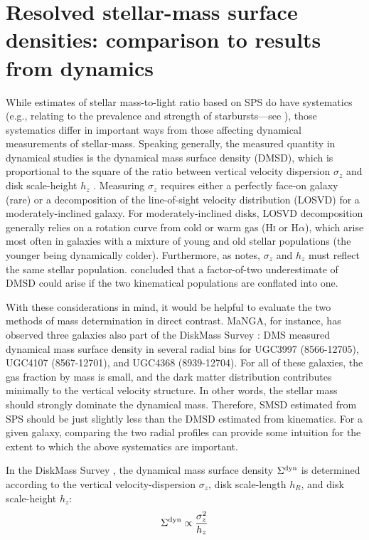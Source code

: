\section{Resolved stellar-mass surface densities: comparison to results from dynamics}
\label{chap2:sec:dms_compare}

While estimates of stellar mass-to-light ratio based on SPS do have systematics (e.g., relating to the prevalence and strength of starbursts---see ), those systematics differ in important ways from those affecting dynamical measurements of stellar-mass. Speaking generally, the measured quantity in dynamical studies is the dynamical mass surface density (DMSD), which is proportional to the square of the ratio between vertical velocity dispersion $\sigma_z$ and disk scale-height $h_z$ \citep{diskmass_i}. Measuring $\sigma_z$ requires either a perfectly face-on galaxy (rare) or a decomposition of the line-of-sight velocity distribution (LOSVD) for a moderately-inclined galaxy. For moderately-inclined disks, LOSVD decomposition generally relies on a rotation curve from cold or warm gas (\textsc{Hi} or H$\alpha$), which arise most often in galaxies with a mixture of young and old stellar populations (the younger being dynamically colder). Furthermore, as \citet{aniyan_freeman_18} notes, $\sigma_z$ and $h_z$ must reflect the same stellar population. \citet{aniyan_freeman_16} concluded that a factor-of-two underestimate of DMSD could arise if the two kinematical populations are conflated into one.

With these considerations in mind, it would be helpful to evaluate the two methods of mass determination in direct contrast. MaNGA, for instance, has observed three galaxies also part of the DiskMass Survey \citep[DMS, ][]{diskmass_i}: DMS measured dynamical mass surface density in several radial bins for UGC3997 (8566-12705), UGC4107 (8567-12701), and UGC4368 (8939-12704). For all of these galaxies, the gas fraction by mass is small, and the dark matter distribution contributes minimally to the vertical velocity structure. In other words, the stellar mass should strongly dominate the dynamical mass. Therefore, SMSD estimated from SPS should be just slightly less than the DMSD estimated from kinematics. For a given galaxy, comparing the two radial profiles can provide some intuition for the extent to which the above systematics are important.

In the DiskMass Survey \citep{diskmass_i}, the dynamical mass surface density $\Sigma^{\rm dyn}$ is determined according to the vertical velocity-dispersion $\sigma_z$, disk scale-length $h_R$, and disk scale-height $h_z$:
%
\begin{equation}
    \Sigma^{\rm dyn} \propto \frac{\sigma_z^2}{h_z}
    \label{eqn:dyn_smsd}
\end{equation}

